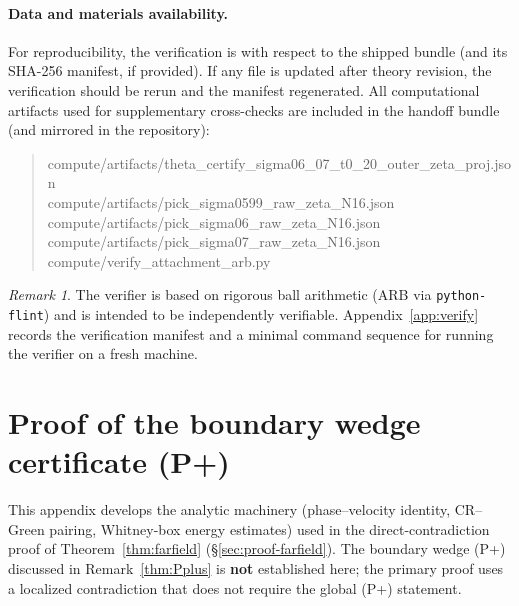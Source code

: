 \documentclass[11pt]{amsart}
\theoremstyle{definition}
\theoremstyle{remark}
\newtheorem{remark}[theorem]{Remark}
\begin{document}
\paragraph{Data and materials availability.}
For reproducibility, the verification is with respect to the shipped bundle (and its SHA-256 manifest, if provided). If any file is updated after theory revision, the verification should be rerun and the manifest regenerated.
All computational artifacts used for supplementary cross-checks are included in the handoff bundle (and mirrored in the repository):
\begin{quote}\small\ttfamily
compute/artifacts/theta\_certify\_sigma06\_07\_t0\_20\_outer\_zeta\_proj.json\\
compute/artifacts/pick\_sigma0599\_raw\_zeta\_N16.json\\
compute/artifacts/pick\_sigma06\_raw\_zeta\_N16.json\\
compute/artifacts/pick\_sigma07\_raw\_zeta\_N16.json\\
compute/verify\_attachment\_arb.py
\end{quote}
\begin{remark}\label{rem:artifact-repro}
The verifier is based on rigorous ball arithmetic (ARB via \texttt{python-flint}) and is intended to be independently verifiable.
Appendix~\ref{app:verify} records the verification manifest and a minimal command sequence for running the verifier on a fresh machine.

\end{remark}

\appendix
\section{Proof of the boundary wedge certificate \textup{(P+)}}\label{app:pplus-proof}
This appendix develops the analytic machinery
(phase--velocity identity, CR--Green pairing, Whitney-box energy estimates)
used in the direct-contradiction proof of Theorem~\ref{thm:farfield} (\S\ref{sec:proof-farfield}).
The boundary wedge \textup{(P+)} discussed in Remark~\ref{thm:Pplus}
is \textbf{not} established here; the primary proof uses a localized contradiction
that does not require the global \textup{(P+)} statement.


\end{document}
